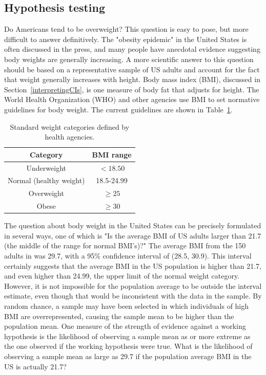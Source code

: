 \begin{spacing}{1.5}

\section[Hypothesis testing]{Hypothesis testing} %
\label{hypothesisTesting}


Do Americans tend to be overweight? This question is easy to pose, but more difficult to answer definitively. The "obesity epidemic" in the United States is often discussed in the press, and many people have anecdotal evidence suggesting body weights are generally increasing. A more scientific answer to this question should be based on a representative sample of US adults and account for the fact that weight generally increases with height. Body mass index (BMI), discussed in Section~\ref{interpretingCIs}, is one measure of body fat that adjusts for height. The World Health Organization (WHO) and other agencies use BMI to set normative guidelines for body weight. The current guidelines are shown in Table~\ref{whoBmiGuidelines}. 


\begin{table}[h!]
\begin{center}
\begin{tabular}{|c|c|}
\hline 
Category & BMI range\tabularnewline
\hline 
\hline 
Underweight & $<18.50$\tabularnewline
\hline 
Normal (healthy weight) & 18.5-24.99\tabularnewline
\hline 
Overweight & $\geq 25$\tabularnewline
\hline 
Obese & $\geq30$\tabularnewline
\hline
\end{tabular}
\caption{Standard weight categories defined by health agencies.} 
\label{whoBmiGuidelines}
\end{center}
\end{table}

The question about body weight in the United States can be precisely formulated in several ways, one of which is  "Is the average BMI of US adults larger than 21.7 (the middle of the range for normal BMI's)?" The average BMI from the 150 adults in  was 29.7, with a 95\% confidence interval of (28.5, 30.9). This interval certainly suggests that the average BMI in the US population is higher than 21.7, and even higher than 24.99, the upper limit of the normal weight category.  However, it is not impossible for the population average to be outside the interval estimate, even though that would be inconsistent with the data in the sample. By random chance, a sample may have been selected in which individuals of high BMI are overrepresented, causing the sample mean to be higher than the population mean. One measure of the strength of evidence against a working hypothesis is the likelihood of observing a sample mean as or more extreme as the one observed if the working hypothesis were true. What is the likelihood of observing a sample mean as large as 29.7 if the population average BMI in the US is actually 21.7?


\end{spacing}
